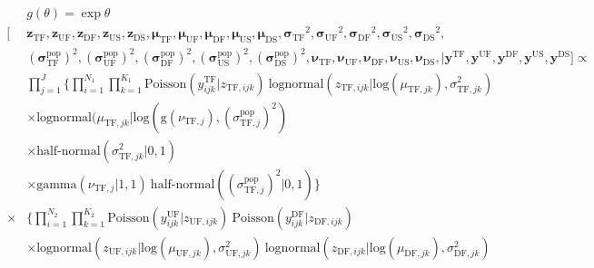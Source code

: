 \documentclass[12pt, oneside, titlepage]{article}   	%
\begin{document}
%


\begin{align}
  \begin{split}
  & g( \theta )  = \exp{\theta}
 \\ [ &  \bm{z_{\mathrm{TF}}} ,  \bm{z_{\mathrm{UF}}},  \bm{z_{\mathrm{DF}}},  \bm{z_{\mathrm{US}}},  \bm{z_{\mathrm{DS}}},  \bm{\mu_{\mathrm{TF}}} ,  \bm{\mu_{\mathrm{UF}}},  \bm{\mu_{\mathrm{DF}}},  \bm{\mu_{\mathrm{US}}},  \bm{\mu_{\mathrm{DS}}},   \bm{\sigma_{\mathrm{TF}}}^2 ,  \bm{\sigma_{\mathrm{UF}}}^2,  \bm{\sigma_{\mathrm{DF}}}^2,  \bm{\sigma_{\mathrm{US}}}^2,  \bm{\sigma_{\mathrm{DS}}}^2, \\ & ( \bm{\sigma^\mathrm{pop}_{\mathrm{TF}}})^2, ( \bm{\sigma^\mathrm{pop}_{\mathrm{UF}}})^2, ( \bm{\sigma^\mathrm{pop}_{\mathrm{DF}}})^2, ( \bm{\sigma^\mathrm{pop}_{\mathrm{US}}})^2, ( \bm{\sigma^\mathrm{pop}_{\mathrm{DS}}})^2,  \bm{\nu_{\mathrm{TF}}} ,  \bm{\nu_{\mathrm{UF}}},  \bm{\nu_{\mathrm{DF}}},  \bm{\nu_{\mathrm{US}}},  \bm{\nu_{\mathrm{DS}}}, |  \bm{y^{\mathrm{TF}}} , \bm{y^{\mathrm{UF}}} , \bm{y^{\mathrm{DF}}} , \bm{y^{\mathrm{US}}} , \bm{y^{\mathrm{DS}}} ]  \propto  \\  
 	     & \prod_{j=1}^{J}  \Big\{ \prod_{i=1}^{N_1}  \prod_{k=1}^{K_1}  \mathrm{Poisson} ( y^\mathrm{TF}_{ijk} | z_{\mathrm{TF},ijk} )\ \mathrm{lognormal} ( z_{\mathrm{TF},ijk} | \mathrm{log}(\mu_{\mathrm{TF},jk}), \sigma^2_{\mathrm{TF},jk} )  \\
	     & \times \mathrm{lognormal} ( \mu_{\mathrm{TF},jk} | \mathrm{log}(\mathrm{g}(\nu_{\mathrm{TF},j}), (\sigma^\mathrm{pop}_{\mathrm{TF},j} )^2)  \\
	     & \times \textrm{half-normal}  ( \sigma^2_{\mathrm{TF},jk}  | 0, 1 ) \\
	     & \times \mathrm{gamma} (\nu_{\mathrm{TF},j} | 1 , 1)\  \textrm{half-normal} ( (\sigma^\mathrm{pop}_{\mathrm{TF},j} )^2 | 0, 1 ) \Big\}  \\
  \times &  \Big\{ \prod_{i=1}^{N_2}  \prod_{k=1}^{K_2}  \mathrm{Poisson} ( y^\mathrm{UF}_{ijk} | z_{\mathrm{UF},ijk} )\  \mathrm{Poisson} ( y^\mathrm{DF}_{ijk} | z_{\mathrm{DF},ijk} ) \\
  & \times  \mathrm{lognormal} ( z_{\mathrm{UF},ijk} | \mathrm{log}(\mu_{\mathrm{UF},jk}), \sigma^2_{\mathrm{UF},jk} )\ \mathrm{lognormal} ( z_{\mathrm{DF},ijk} | \mathrm{log}(\mu_{\mathrm{DF},jk}), \sigma^2_{\mathrm{DF},jk} )    \\

\end{split}
\end{align}
\end{document}
